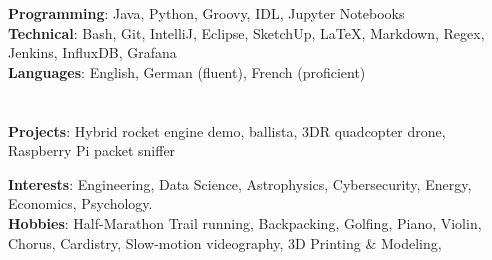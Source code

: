 \documentclass[11pt]{article}
\begin{document}
\spacedhrule{-.6em}{-0.6em}


\vspace{-1em}
\begin{multicols*}{2}
\hspace{-1.8em} 
\textbf{Programming}: Java, Python, Groovy, IDL, Jupyter Notebooks \\
\textbf{Technical}: Bash, Git, IntelliJ, Eclipse, SketchUp, \LaTeX, Markdown, Regex, Jenkins, InfluxDB, Grafana \\
\textbf{Languages}:
English, German (fluent), French (proficient) \\ \\ \\
\textbf{Projects}:
Hybrid rocket engine demo, ballista, 3DR quadcopter drone, Raspberry Pi packet sniffer

\hspace{-1.8em} \textbf{Interests}: Engineering, Data Science, Astrophysics, Cybersecurity, Energy, Economics, Psychology. \\
\textbf{Hobbies}: Half-Marathon Trail running, Backpacking, Golfing, Piano, Violin, Chorus, Cardistry, Slow-motion videography, 3D Printing \& Modeling,
	
\end{multicols*}
\end{document}
